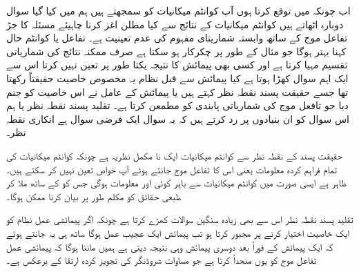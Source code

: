 اب چونکہ میں توقع کرتا ہوں آپ کوانٹم میکانیات کو سمجھتے ہیں ہم  میں کیا گیا سوال دوبارہ اٹھاتے ہیں کوانٹم میکانیات کے نتائج سے کیا مطلن اغز کرنا چاہیئے مسئلہ کا جڑ تفاعل موج کے ساتھ وابستہ شماریتای مفہوم کی عدم تعینیت ہے۔ تفاعل  یا کوانٹم حال کہنا بہتر ہوگا جو مثال کے طور پر چکرکار ہو سکتا ہے صرف ممکنہ نتائج کی شماریاتی تقسیم مہیا کرتا ہے اور کسی بھی پیمائش کا نتیجہ یکتا طور پر تعین نہیں کرتا اس سے ایک اہم سوال کھڑا ہوتا ہے کیا پیمائش سے قبل نظام یہ مخصوص خاصیت حقیقتاً رکھتا تھا جسے حقیقت پسند نقطہ نظر کہتے ہیں یا پیمائش کے عامل نے اس خاصیت کو جنم دیا جو تافعل موج کی شماریاتی پابندی کو مطمعن کرتا ہے۔ تقلید پسند نقطہ نظر یا ہم اس سوال کو ان بنیادوں پر رد کرتے ہیں کہ یہ سوال ایک فرضی سوال ہے انکاری نقطہ نظر۔

حقیقت پسند کے نقطہ نظر سے کوانٹم میکانیات ایک نا مکمل نظریہ ہے چونکہ کوانٹم میکانیات کی تمام فراہم کردہ معلومات یعنی اس کا تفاعل موج جانتے ہوئے آپ خواص تعین نہیں کر سکتے ہیں۔ ظاہر ہے ایسی صورت میں کوانٹم میکانیات سے باہر کوئی اور معلومات ہوگی جس کو  کے ساتھ ملا کر طبعی حقائق کو مکلم طور پر بیان کرنا ممکن ہوگا۔

تقلید پسند نقطہ نظر اس سے بھی زیادہ سنگین سوالات کھڑے کرتا ہے چونکہ اگر پیمائشی عمل نظام کو ایک خاصیت اختیار کرنے پر مجبور کرتا ہو تب پیمائش ایک عجیب عمل ہوگا ساتھ ہی یہ جانتے ہوئے کہ ایک پیمائش کے فوراً بعد دوسری پیمائش وہی نتیجہ دیتی ہے ہمیں ماننا ہوگا کہ پیمائشی عمل تفاعل موج کو یوں منحداً کرتا ہے جو مساوات شروڈنگر کی تجویز کردہ ارتقا کے برعکس ہے۔

